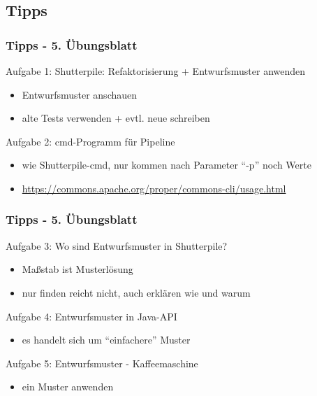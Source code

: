 \documentclass[18pt]{beamer}
\begin{document}
	\subsection{Tipps}
	\begin{frame}
		\frametitle{Tipps - 5. Übungsblatt}
			\begin{exampleblock}{Aufgabe 1: Shutterpile: Refaktorisierung + Entwurfsmuster anwenden} 
				\begin{itemize}
					\item Entwurfsmuster anschauen
					\item alte Tests verwenden + evtl. neue schreiben
				\end{itemize}
			\end{exampleblock}
			\pause
			\begin{exampleblock}{Aufgabe 2: cmd-Programm für Pipeline} 
				\begin{itemize}
					\item wie Shutterpile-cmd, nur kommen nach Parameter \enquote{-p} noch Werte
					\item \url{https://commons.apache.org/proper/commons-cli/usage.html}
				\end{itemize}
			\end{exampleblock}
	\end{frame}

	\begin{frame}
		\frametitle{Tipps - 5. Übungsblatt}
			\begin{exampleblock}{Aufgabe 3: Wo sind Entwurfsmuster in Shutterpile?}
				\begin{itemize}
					\item Maßstab ist Musterlösung
					\item nur finden reicht nicht, auch erklären wie und warum
				\end{itemize}
			\end{exampleblock}
			\pause
			\begin{exampleblock}{Aufgabe 4: Entwurfsmuster in Java-API}
				\begin{itemize}
					\item es handelt sich um \enquote{einfachere} Muster
				\end{itemize}
			\end{exampleblock}
			\pause
			\begin{exampleblock}{Aufgabe 5: Entwurfsmuster - Kaffeemaschine}
				\begin{itemize}
					\item ein Muster anwenden
				\end{itemize}
			\end{exampleblock}
	\end{frame}
	
\end{document}
